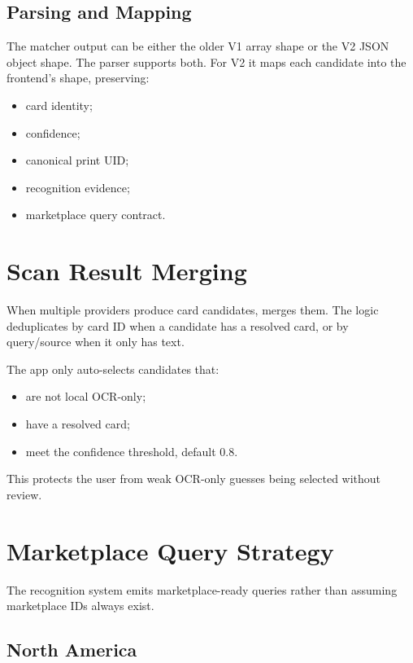 \documentclass[11pt,a4paper]{article}
\begin{document}
\subsection{Parsing and Mapping}

The matcher output can be either the older V1 array shape or the V2 JSON object shape. The parser supports both. For V2 it maps each candidate into the frontend's  shape, preserving:

\begin{itemize}
  \item card identity;
  \item confidence;
  \item canonical print UID;
  \item recognition evidence;
  \item marketplace query contract.
\end{itemize}

\section{Scan Result Merging}

When multiple providers produce card candidates,  merges them. The logic deduplicates by card ID when a candidate has a resolved card, or by query/source when it only has text.

The app only auto-selects candidates that:

\begin{itemize}
  \item are not local OCR-only;
  \item have a resolved card;
  \item meet the confidence threshold, default 0.8.
\end{itemize}

This protects the user from weak OCR-only guesses being selected without review.

\section{Marketplace Query Strategy}

The recognition system emits marketplace-ready queries rather than assuming marketplace IDs always exist.

\subsection{North America}
\end{document}
